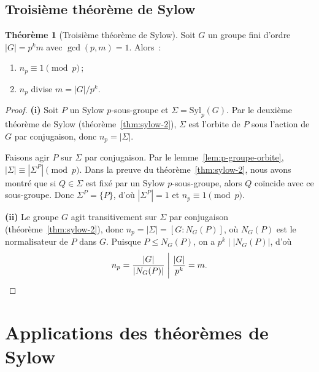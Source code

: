 \documentclass[12pt,a4paper,openany]{book}
\theoremstyle{definition}
\newtheorem{theoreme}{Théorème}[chapter]
\begin{document}
\subsection{Troisième théorème de Sylow}\label{subsec:sylow-3}

\begin{theoreme}[Troisième théorème de Sylow]\label{thm:sylow-3}
  Soit $G$ un groupe fini d'ordre $|G|=p^k m$ avec $\gcd(p,m)=1$.
  Alors~:
  \begin{enumerate}[label=(\roman*)]
    \item $n_p\equiv 1\pmod{p}$\,;
    \item $n_p$ divise $m = |G|/p^k$.
  \end{enumerate}
\end{theoreme}

\begin{proof}
  \textbf{(i)} Soit $P$ un Sylow $p$-sous-groupe et
  $\Sigma = \mathrm{Syl}_p(G)$. Par le deuxième théorème de Sylow
  (théorème~\ref{thm:sylow-2}), $\Sigma$ est l'orbite de $P$ sous
  l'action de $G$ par conjugaison, donc $n_p = |\Sigma|$.

  Faisons agir $P$ sur $\Sigma$ par conjugaison. Par le
  lemme~\ref{lem:p-groupe-orbite},
  $|\Sigma|\equiv|\Sigma^P|\pmod{p}$.
  Dans la preuve du théorème~\ref{thm:sylow-2}, nous avons montré que
  si $Q\in\Sigma$ est fixé par un Sylow $p$-sous-groupe, alors
  $Q$ coïncide avec ce sous-groupe. Donc $\Sigma^P = \{P\}$,
  d'où $|\Sigma^P|=1$ et $n_p\equiv 1\pmod{p}$.

  \medskip

  \textbf{(ii)} Le groupe $G$ agit transitivement sur $\Sigma$ par
  conjugaison (théorème~\ref{thm:sylow-2}), donc
  $n_p = |\Sigma| = [G:N_G(P)]$, où $N_G(P)$ est le normalisateur
  de $P$ dans $G$. Puisque $P\leq N_G(P)$, on a $p^k\mid |N_G(P)|$,
  d'où
  \[
    n_p = \frac{|G|}{|N_G(P)|} \;\Bigg|\; \frac{|G|}{p^k} = m. \qedhere
  \]
\end{proof}

\section{Applications des théorèmes de Sylow}\label{sec:applications-sylow}
\end{document}
